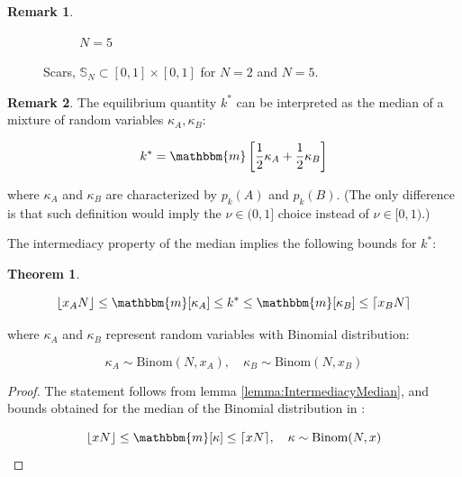 \documentclass{article}
\theoremstyle{definition}
\newtheorem{theorem}{Theorem}[section]
\newtheorem*{remark}{Remark}
\begin{document}
\begin{remark}
\begin{figure}[H]
\begin{subfigure}[b]{0.4\textwidth}
        \caption{$N=5$}
        \label{fig:Scars_5}
    \end{subfigure}
    
    \caption{Scars, $\mathbb{S}_N \subset [0,1] \times [0,1]$ for $N=2$ and $N=5$.}
    \label{fig:Scars}
\end{figure}

    
\end{remark}

\begin{remark}
    The equilibrium quantity $k^*$ can be interpreted as the median \cite{book:DeGrootProbabilityAndStatistics,book:IntroToProbability} of a mixture of random variables $\kappa_A, \kappa_B$:

    \begin{equation}
        k^* = \mathbbm{m}
        \left [ \frac{1}{2} \kappa_A+
        \frac{1}{2}\kappa_B
        \right ]
    \end{equation}

    where $\kappa_A$ and $\kappa_B$ are characterized by $p_k(A)$ and $p_k(B)$.
    (The only difference is that such definition would imply the $\nu \in (0,1]$ choice instead of $\nu \in [0,1)$.)
    
\end{remark}

The intermediacy property of the median implies the following bounds for $k^*$:

\begin{theorem}
\label{thm:BinomialKMedianBounds}

    \begin{equation}
        \lfloor x_A N \rfloor
        \le
        \mathbbm{m}[\kappa_A]
        \le
        k^*
        \le
        \mathbbm{m}[\kappa_B]
        \le
        \lceil x_B N \rceil
    \end{equation}

    where $\kappa_A$ and $\kappa_B$ represent random variables with Binomial distribution:

    \begin{equation}
        \kappa_A \sim \mathrm{Binom}(N,x_A), \quad
        \kappa_B \sim \mathrm{Binom}(N,x_B)
    \end{equation}

\end{theorem}

\begin{proof}
    The statement follows from lemma \ref{lemma:IntermediacyMedian}, and bounds obtained for the median of the Binomial distribution in \cite{paper:BinomialMedianMode}:

    \begin{equation}
    \lfloor x N \rfloor 
    \le 
    \mathbbm{m}[\kappa] 
    \le
    \lceil x N \rceil, 
    \quad
    \kappa \sim \mathrm{Binom}(N,x)
    \end{equation}
    
\end{proof}
\end{document}

